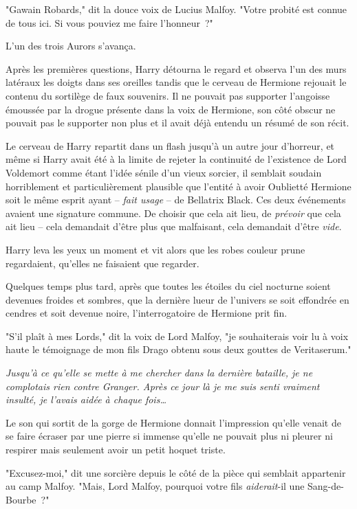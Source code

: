 "Gawain Robards," dit la douce voix de Lucius Malfoy. "Votre probité est connue de tous ici. Si vous pouviez me faire l'honneur~?"

L'un des trois Aurors s'avança.

Après les premières questions, Harry détourna le regard et observa l'un des murs latéraux les doigts dans ses oreilles tandis que le cerveau de Hermione rejouait le contenu du sortilège de faux souvenirs. Il ne pouvait pas supporter l'angoisse émoussée par la drogue présente dans la voix de Hermione, son côté obscur ne pouvait pas le supporter non plus et il avait déjà entendu un résumé de son récit.

Le cerveau de Harry repartit dans un flash jusqu'à un autre jour d'horreur, et même si Harry avait été à la limite de rejeter la continuité de l'existence de Lord Voldemort comme étant l'idée sénile d'un vieux sorcier, il semblait soudain horriblement et particulièrement plausible que l'entité à avoir Oublietté Hermione soit le même esprit ayant -- \emph{fait usage} -- de Bellatrix Black. Ces deux événements avaient une signature commune. De choisir que cela ait lieu, de \emph{prévoir} que cela ait lieu -- cela demandait d'être plus que malfaisant, cela demandait d'être \emph{vide}.

Harry leva les yeux un moment et vit alors que les robes couleur prune regardaient, qu'elles ne faisaient que regarder.

Quelques temps plus tard, après que toutes les étoiles du ciel nocturne soient devenues froides et sombres, que la dernière lueur de l'univers se soit effondrée en cendres et soit devenue noire, l'interrogatoire de Hermione prit fin.

"S'il plaît à mes Lords," dit la voix de Lord Malfoy, "je souhaiterais voir lu à voix haute le témoignage de mon fils Drago obtenu sous deux gouttes de Veritaserum."

\emph{Jusqu'à ce qu'elle se mette à me chercher dans la dernière bataille, je ne complotais rien contre Granger. Après ce jour là je me suis senti vraiment insulté, je l'avais aidée à chaque fois…}

Le son qui sortit de la gorge de Hermione donnait l'impression qu'elle venait de se faire écraser par une pierre si immense qu'elle ne pouvait plus ni pleurer ni respirer mais seulement avoir un petit hoquet triste.

"Excusez-moi," dit une sorcière depuis le côté de la pièce qui semblait appartenir au camp Malfoy. "Mais, Lord Malfoy, pourquoi votre fils \emph{aiderait}-il une Sang-de-Bourbe~?"

